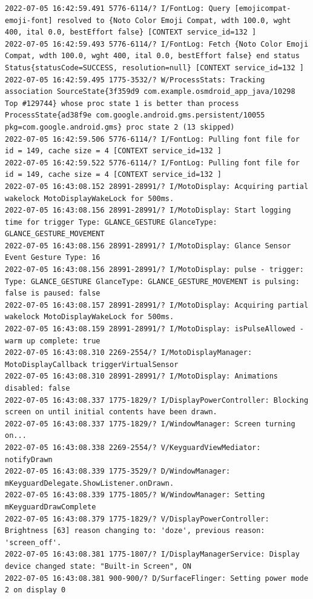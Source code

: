 \documentclass[a4paper,12pt]{book}
\begin{document}
\begin{lstlisting}
2022-07-05 16:42:59.491 5776-6114/? I/FontLog: Query [emojicompat-emoji-font] resolved to {Noto Color Emoji Compat, wdth 100.0, wght 400, ital 0.0, bestEffort false} [CONTEXT service_id=132 ]
2022-07-05 16:42:59.493 5776-6114/? I/FontLog: Fetch {Noto Color Emoji Compat, wdth 100.0, wght 400, ital 0.0, bestEffort false} end status Status{statusCode=SUCCESS, resolution=null} [CONTEXT service_id=132 ]
2022-07-05 16:42:59.495 1775-3532/? W/ProcessStats: Tracking association SourceState{3f359d9 com.example.osmdroid_app_java/10298 Top #129744} whose proc state 1 is better than process ProcessState{ad38f9e com.google.android.gms.persistent/10055 pkg=com.google.android.gms} proc state 2 (13 skipped)
2022-07-05 16:42:59.506 5776-6114/? I/FontLog: Pulling font file for id = 149, cache size = 4 [CONTEXT service_id=132 ]
2022-07-05 16:42:59.522 5776-6114/? I/FontLog: Pulling font file for id = 149, cache size = 4 [CONTEXT service_id=132 ]
2022-07-05 16:43:08.152 28991-28991/? I/MotoDisplay: Acquiring partial wakelock MotoDisplayWakeLock for 500ms.
2022-07-05 16:43:08.156 28991-28991/? I/MotoDisplay: Start logging time for trigger Type: GLANCE_GESTURE GlanceType: GLANCE_GESTURE_MOVEMENT
2022-07-05 16:43:08.156 28991-28991/? I/MotoDisplay: Glance Sensor Event Gesture Type: 16
2022-07-05 16:43:08.156 28991-28991/? I/MotoDisplay: pulse - trigger: Type: GLANCE_GESTURE GlanceType: GLANCE_GESTURE_MOVEMENT is pulsing: false is paused: false
2022-07-05 16:43:08.157 28991-28991/? I/MotoDisplay: Acquiring partial wakelock MotoDisplayWakeLock for 500ms.
2022-07-05 16:43:08.159 28991-28991/? I/MotoDisplay: isPulseAllowed - warm up complete: true
2022-07-05 16:43:08.310 2269-2554/? I/MotoDisplayManager: MotoDisplayCallback triggerVirtualSensor
2022-07-05 16:43:08.310 28991-28991/? I/MotoDisplay: Animations disabled: false
2022-07-05 16:43:08.337 1775-1829/? I/DisplayPowerController: Blocking screen on until initial contents have been drawn.
2022-07-05 16:43:08.337 1775-1829/? I/WindowManager: Screen turning on...
2022-07-05 16:43:08.338 2269-2554/? V/KeyguardViewMediator: notifyDrawn
2022-07-05 16:43:08.339 1775-3529/? D/WindowManager: mKeyguardDelegate.ShowListener.onDrawn.
2022-07-05 16:43:08.339 1775-1805/? W/WindowManager: Setting mKeyguardDrawComplete
2022-07-05 16:43:08.379 1775-1829/? V/DisplayPowerController: Brightness [63] reason changing to: 'doze', previous reason: 'screen_off'.
2022-07-05 16:43:08.381 1775-1807/? I/DisplayManagerService: Display device changed state: "Built-in Screen", ON
2022-07-05 16:43:08.381 900-900/? D/SurfaceFlinger: Setting power mode 2 on display 0

\end{lstlisting}
\end{document}
